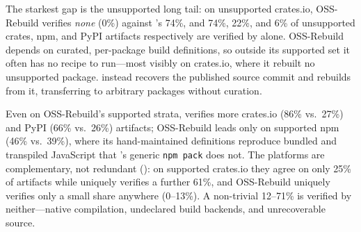 The starkest gap is the unsupported long tail: on unsupported crates.io, OSS-Rebuild verifies \emph{none} (0\%) against \toolname's 74\%, and 74\%, 22\%, and 6\% of unsupported crates, npm, and PyPI artifacts respectively are verified by \toolname alone. OSS-Rebuild depends on curated, per-package build definitions, so outside its supported set it often has no recipe to run---most visibly on crates.io, where it rebuilt no unsupported package. \toolname instead recovers the published source commit and rebuilds from it, transferring to arbitrary packages without curation.
\begin{table}[t]
  \centering
  \caption{Verification by \toolname{} and OSS-Rebuild on 600 artifacts
  (100 per ecosystem/stratum).}
  \label{tab:rq4-comparison}
  \scriptsize
  \vspace{-0.5em}
\end{table}

Even on OSS-Rebuild's supported strata, \toolname verifies more crates.io (86\% vs.\ 27\%) and PyPI (66\% vs.\ 26\%) artifacts; OSS-Rebuild leads only on supported npm (46\% vs.\ 39\%), where its hand-maintained definitions reproduce bundled and transpiled JavaScript that \toolname's generic \texttt{npm pack} does not. The platforms are complementary, not redundant (): on supported crates.io they agree on only 25\% of artifacts while \toolname uniquely verifies a further 61\%, and OSS-Rebuild uniquely verifies only a small share anywhere (0--13\%). A non-trivial 12--71\% is verified by neither---native compilation, undeclared build backends, and unrecoverable source.

